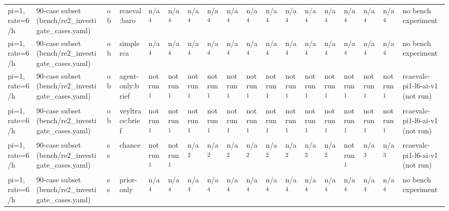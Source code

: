 \begin{table}[t]
\begin{tabular}{llllllllllllllllll}
pi=1, rate=6/h & 90-case subset (bench/re2\_investigate\_cases.yaml) & ob & rcaeval:baro & n/a\textsuperscript{4} & n/a\textsuperscript{4} & n/a\textsuperscript{4} & n/a\textsuperscript{4} & n/a\textsuperscript{4} & n/a\textsuperscript{4} & n/a\textsuperscript{4} & n/a\textsuperscript{4} & n/a\textsuperscript{4} & n/a\textsuperscript{4} & n/a\textsuperscript{4} & n/a\textsuperscript{4} & n/a\textsuperscript{4} & no bench experiment \\
pi=1, rate=6/h & 90-case subset (bench/re2\_investigate\_cases.yaml) & ob & simplerca & n/a\textsuperscript{4} & n/a\textsuperscript{4} & n/a\textsuperscript{4} & n/a\textsuperscript{4} & n/a\textsuperscript{4} & n/a\textsuperscript{4} & n/a\textsuperscript{4} & n/a\textsuperscript{4} & n/a\textsuperscript{4} & n/a\textsuperscript{4} & n/a\textsuperscript{4} & n/a\textsuperscript{4} & n/a\textsuperscript{4} & no bench experiment \\
pi=1, rate=6/h & 90-case subset (bench/re2\_investigate\_cases.yaml) & ob & agent-only:brief & not run\textsuperscript{1} & not run\textsuperscript{1} & not run\textsuperscript{1} & not run\textsuperscript{1} & not run\textsuperscript{1} & not run\textsuperscript{1} & not run\textsuperscript{1} & not run\textsuperscript{1} & not run\textsuperscript{1} & not run\textsuperscript{1} & not run\textsuperscript{1} & not run\textsuperscript{1} & not run\textsuperscript{1} & rcaevalc-pi1-l6-ai-v1 (not run) \\
pi=1, rate=6/h & 90-case subset (bench/re2\_investigate\_cases.yaml) & ob & veyltrace:brief & not run\textsuperscript{1} & not run\textsuperscript{1} & not run\textsuperscript{1} & not run\textsuperscript{1} & not run\textsuperscript{1} & not run\textsuperscript{1} & not run\textsuperscript{1} & not run\textsuperscript{1} & not run\textsuperscript{1} & not run\textsuperscript{1} & not run\textsuperscript{1} & not run\textsuperscript{1} & not run\textsuperscript{1} & rcaevalc-pi1-l6-ai-v1 (not run) \\
pi=1, rate=6/h & 90-case subset (bench/re2\_investigate\_cases.yaml) & ss & chance & not run\textsuperscript{1} & not run\textsuperscript{1} & n/a\textsuperscript{2} & n/a\textsuperscript{2} & n/a\textsuperscript{2} & n/a\textsuperscript{2} & n/a\textsuperscript{2} & n/a\textsuperscript{2} & n/a\textsuperscript{2} & n/a\textsuperscript{2} & not run\textsuperscript{1} & n/a\textsuperscript{3} & n/a\textsuperscript{3} & rcaevalc-pi1-l6-ai-v1 (not run) \\
pi=1, rate=6/h & 90-case subset (bench/re2\_investigate\_cases.yaml) & ss & prior-only & n/a\textsuperscript{4} & n/a\textsuperscript{4} & n/a\textsuperscript{4} & n/a\textsuperscript{4} & n/a\textsuperscript{4} & n/a\textsuperscript{4} & n/a\textsuperscript{4} & n/a\textsuperscript{4} & n/a\textsuperscript{4} & n/a\textsuperscript{4} & n/a\textsuperscript{4} & n/a\textsuperscript{4} & n/a\textsuperscript{4} & no bench experiment \\

\end{tabular}
\end{table}
